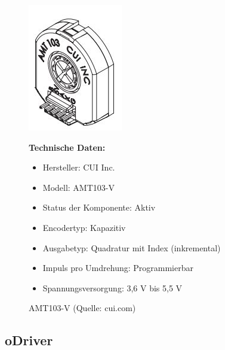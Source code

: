 \begin{figure}[htb]
	\centering
	\begin{minipage}{0.38\linewidth}
		\centering
		\includegraphics[scale=0.9]{images/Entcoder.jpg}
		\caption{AMT103-V  \newline (Quelle: cui.com)}
		\label{Endcoder}
	\end{minipage}
	\begin{minipage}[h]{0.6\textwidth}
		\textbf{Technische Daten:} 
		\begin{itemize} 
			\item Hersteller: CUI Inc.
			\item Modell:	AMT103-V
			\item Status der Komponente:	Aktiv
			\item Encodertyp:	Kapazitiv
			\item Ausgabetyp: Quadratur mit Index (inkremental)
			\item Impuls pro Umdrehung: Programmierbar
			\item Spannungsversorgung:	3,6 V bis 5,5 V
		\end{itemize}
	\end{minipage}
\end{figure}


\subsection{oDriver}

